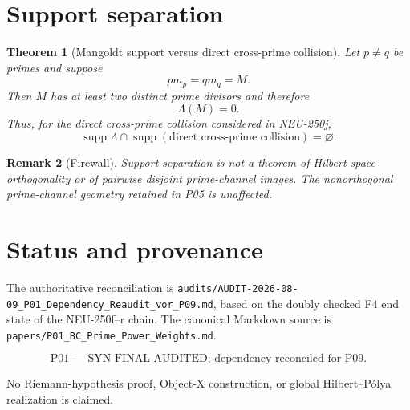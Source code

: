\documentclass[11pt,a4paper]{amsart}
\newtheorem{theorem}{Theorem}[section]
\newtheorem{remark}[theorem]{Remark}
\begin{document}
\section{Support separation}

\begin{theorem}[Mangoldt support versus direct cross-prime collision]
Let $p\ne q$ be primes and suppose
\[
  pm_p=qm_q=M.
\]
Then $M$ has at least two distinct prime divisors and therefore
\[
  \Lambda(M)=0.
\]
Thus, for the direct cross-prime collision considered in NEU-250j,
\[
  \boxed{
  \operatorname{supp}\Lambda
  \cap
  \operatorname{supp}(\text{direct cross-prime collision})
  =\varnothing.
  }
\]
\end{theorem}

\begin{remark}[Firewall]
Support separation is not a theorem of Hilbert-space orthogonality or of
pairwise disjoint prime-channel images.  The nonorthogonal prime-channel
geometry retained in P05 is unaffected.
\end{remark}

\section{Status and provenance}

The authoritative reconciliation is
\texttt{audits/AUDIT-2026-08-09\_P01\_Dependency\_Reaudit\_vor\_P09.md},
based on the doubly checked F4 end state of the NEU-250f--r chain.
The canonical Markdown source is
\texttt{papers/P01\_BC\_Prime\_Power\_Weights.md}.

\[
  \boxed{\text{P01 --- SYN FINAL AUDITED; dependency-reconciled for P09}.}
\]

No Riemann-hypothesis proof, Object-X construction, or global
Hilbert--P\'olya realization is claimed.
\end{document}

